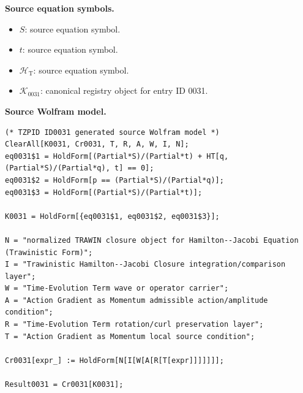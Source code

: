 \begin{minipage}[t]{0.49\linewidth}
\begingroup
\small
\raggedright
\textbf{Source equation symbols.}\par
\begin{itemize}[leftmargin=1.35em,itemsep=1pt,topsep=1pt,parsep=0pt]
    \item $S$: source equation symbol.
    \item $t$: source equation symbol.
    \item $\mathcal{H}_{\mathrm{T}}$: source equation symbol.
    \item $\mathcal{K}_{0031}$: canonical registry object for entry ID 0031.
\end{itemize}
\endgroup
\end{minipage}\hfill
\begin{minipage}[t]{0.47\linewidth}
\begingroup
\scriptsize
\raggedright
\textbf{Source Wolfram model.}\par
\begin{Verbatim}[fontsize=\tiny,breaklines=true,breakanywhere=true]
(* TZPID ID0031 generated source Wolfram model *)
ClearAll[K0031, Cr0031, T, R, A, W, I, N];
eq0031$1 = HoldForm[(Partial*S)/(Partial*t) + HT[q, (Partial*S)/(Partial*q), t] == 0];
eq0031$2 = HoldForm[p == (Partial*S)/(Partial*q)];
eq0031$3 = HoldForm[(Partial*S)/(Partial*t)];

K0031 = HoldForm[{eq0031$1, eq0031$2, eq0031$3}];

N = "normalized TRAWIN closure object for Hamilton--Jacobi Equation (Trawinistic Form)";
I = "Trawinistic Hamilton--Jacobi Closure integration/comparison layer";
W = "Time-Evolution Term wave or operator carrier";
A = "Action Gradient as Momentum admissible action/amplitude condition";
R = "Time-Evolution Term rotation/curl preservation layer";
T = "Action Gradient as Momentum local source condition";

Cr0031[expr_] := HoldForm[N[I[W[A[R[T[expr]]]]]]];

Result0031 = Cr0031[K0031];
\end{Verbatim}
\endgroup
\end{minipage}

